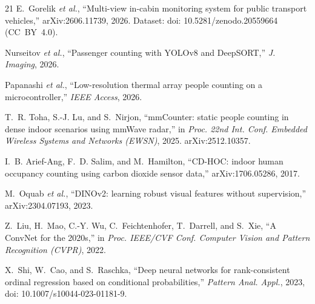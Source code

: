 \documentclass[conference]{IEEEtran}
\begin{document}
\begin{thebibliography}{21}
E.~Gorelik \emph{et al.}, ``Multi-view in-cabin monitoring system for public
transport vehicles,'' arXiv:2606.11739, 2026. Dataset:
doi: 10.5281/zenodo.20559664 (CC~BY~4.0).

Nurseitov \emph{et al.}, ``Passenger counting with YOLOv8 and DeepSORT,''
\emph{J. Imaging}, 2026.

Papanashi \emph{et al.}, ``Low-resolution thermal array people counting on a
microcontroller,'' \emph{IEEE Access}, 2026.

T.~R. Toha, S.-J. Lu, and S.~Nirjon, ``mmCounter: static people counting in
dense indoor scenarios using mmWave radar,'' in \emph{Proc. 22nd Int. Conf.
Embedded Wireless Systems and Networks (EWSN)}, 2025. arXiv:2512.10357.

I.~B. Arief-Ang, F.~D. Salim, and M.~Hamilton, ``CD-HOC: indoor human
occupancy counting using carbon dioxide sensor data,'' arXiv:1706.05286,
2017.

M.~Oquab \emph{et al.}, ``DINOv2: learning robust visual features without
supervision,'' arXiv:2304.07193, 2023.

Z.~Liu, H.~Mao, C.-Y. Wu, C.~Feichtenhofer, T.~Darrell, and S.~Xie, ``A
ConvNet for the 2020s,'' in \emph{Proc. IEEE/CVF Conf. Computer Vision and
Pattern Recognition (CVPR)}, 2022.

X.~Shi, W.~Cao, and S.~Raschka, ``Deep neural networks for rank-consistent
ordinal regression based on conditional probabilities,'' \emph{Pattern Anal.
Appl.}, 2023, doi: 10.1007/s10044-023-01181-9.

\end{thebibliography}
\end{document}
